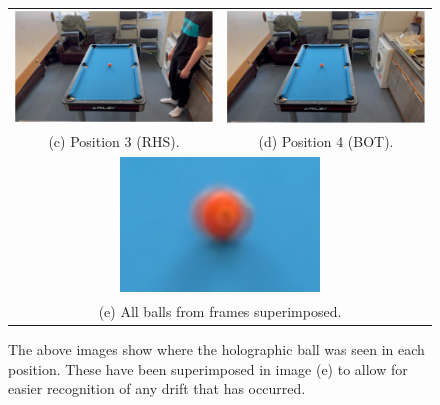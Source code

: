 \documentclass[ %
                author={Finn Alexander Wilkinson},
                supervisor={Dr. Andrew Calway},
                degree={MEng},
                title={\centering A Mixed Reality Aim Assistant for Pool and Snooker},
                subtitle={},
                type={Enterprise},
                year={2021} ]{dissertation}
\begin{document}
\begin{figure}[h!]
\begin{tabular}{cc}
         \includegraphics[scale = 0.15]{Images/Eval/Walk around/Frame 7 - RHS 2.PNG} & \includegraphics[scale = 0.15]{Images/Eval/Walk around/Frame 8 - Front 2.PNG} \\ 
         (c) Position 3 (RHS). & (d) Position 4 (BOT). \\[6pt]
         \multicolumn{2}{c}{\includegraphics[scale = 0.7]{Images/Eval/Walk around/Walk about overlay 2.png}} \\
         \multicolumn{2}{c}{(e) All balls from frames superimposed. }
    \end{tabular}
    \caption{The above images show where the holographic ball was seen in each position. These have been superimposed in image (e) to allow for easier recognition of any drift that has occurred.}
    \label{fig:evalTableMovement}
\end{figure}
\end{document}
